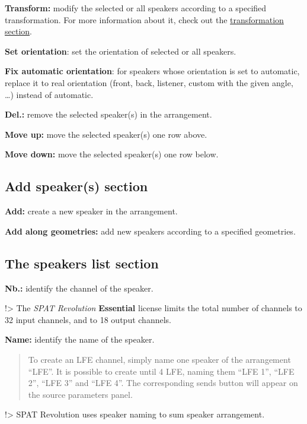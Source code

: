 \documentclass[
  letterpaper,
  DIV=11,
  numbers=noendperiod]{scrreport}
\begin{document}
\textbf{Transform:} modify the selected or all speakers according to a
specified transformation. For more information about it, check out the
\href{Spat_Environment_Transformation.md}{transformation section}.

\textbf{Set orientation}: set the orientation of selected or all
speakers.

\textbf{Fix automatic orientation}: for speakers whose orientation is
set to automatic, replace it to real orientation (front, back, listener,
custom with the given angle, \ldots) instead of automatic.

\textbf{Del.:} remove the selected speaker(s) in the arrangement.

\textbf{Move up:} move the selected speaker(s) one row above.

\textbf{Move down:} move the selected speaker(s) one row below.

\hypertarget{add-speakers-section}{%
\subsection{Add speaker(s) section}\label{add-speakers-section}}

\textbf{Add:} create a new speaker in the arrangement.

\textbf{Add along geometries:} add new speakers according to a specified
geometries.

\hypertarget{the-speakers-list-section}{%
\subsection{The speakers list section}\label{the-speakers-list-section}}

\textbf{Nb.:} identify the channel of the speaker.

!\textgreater{} The \emph{SPAT Revolution} \textbf{Essential} license
limits the total number of channels to 32 input channels, and to 18
output channels.

\textbf{Name:} identify the name of the speaker.

\begin{quote}
To create an LFE channel, simply name one speaker of the arrangement
``LFE''. It is possible to create until 4 LFE, naming them ``LFE 1'',
``LFE 2'', ``LFE 3'' and ``LFE 4''. The corresponding sends button will
appear on the source parameters panel.
\end{quote}

!\textgreater{} SPAT Revolution uses speaker naming to sum speaker
arrangement.
\end{document}
